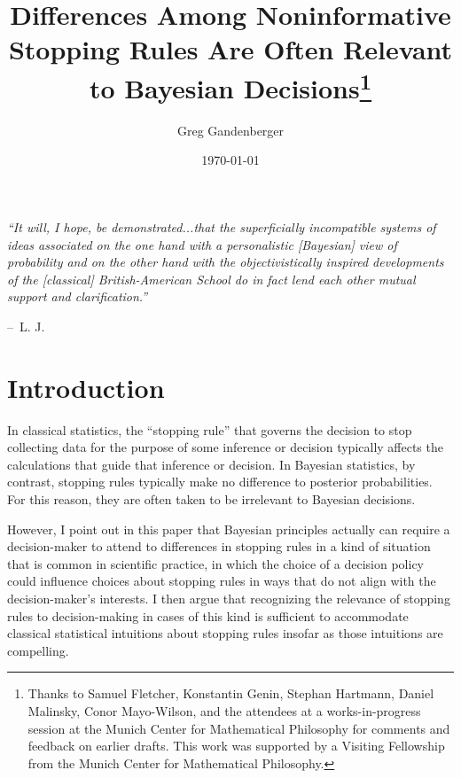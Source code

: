 \documentclass{article}
\title{Differences Among Noninformative Stopping Rules Are Often Relevant to Bayesian Decisions\footnote{Thanks to Samuel Fletcher, Konstantin Genin, Stephan Hartmann, Daniel Malinsky, Conor Mayo-Wilson, and the attendees at a works-in-progress session at the Munich Center for Mathematical Philosophy for comments and feedback on earlier drafts. This work was supported by a Visiting Fellowship from the Munich Center for Mathematical Philosophy.}
}
\author{Greg Gandenberger}
\date{\today}
\makeatletter
\theoremstyle{definition}
\newenvironment{chapquote}[2][2em]
  {\setlength{\@tempdima}{#1}%
   \def\chapquote@author{#2}%
   \parshape 1 \@tempdima \dimexpr\textwidth-2\@tempdima\relax%
   \itshape}
  {\par\normalfont\hfill--\ \chapquote@author\hspace*{\@tempdima}\par\bigskip}
\makeatother
\begin{document}
	\maketitle

\begin{chapquote}{L. J. \citet[5]{savage54}}
``It will, I hope, be demonstrated...that the superficially incompatible systems of ideas associated on the one hand with a personalistic [Bayesian] view of probability and on the other hand with the objectivistically inspired developments of the [classical] British-American School do in fact lend each other mutual support and clarification.''
\end{chapquote}

\section{Introduction}\label{sec:intro}

In classical statistics, the ``stopping rule'' that governs the decision to stop collecting data for the purpose of some inference or decision typically affects the calculations that guide that inference or decision.
In Bayesian statistics, by contrast, stopping rules typically make no difference to posterior probabilities.
For this reason, they are often taken to be irrelevant to Bayesian decisions.

However, I point out in this paper that Bayesian principles actually can require a decision-maker to attend to differences in stopping rules in a kind of situation that is common in scientific practice, in which the choice of a decision policy could influence choices about stopping rules in ways that do not align with the decision-maker's interests.
I then argue that recognizing the relevance of stopping rules to decision-making in cases of this kind is sufficient to accommodate classical statistical intuitions about stopping rules insofar as those intuitions are compelling.
\end{document}
